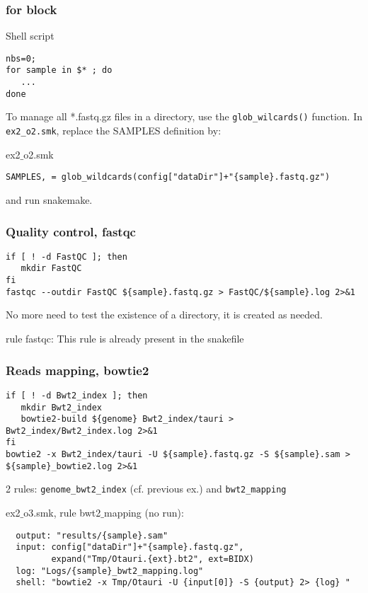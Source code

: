 \begin{frame}[containsverbatim]
\frametitle{for block}
\begin{exampleblock}{Shell script}
\begin{lstlisting}
nbs=0;
for sample in $* ; do 
   ...
done
\end{lstlisting}
\end{exampleblock}
To manage all *.fastq.gz files in a directory, use the \verb|glob_wilcards()| function. In \verb|ex2_o2.smk|, replace the SAMPLES definition by:
\begin{exampleblock}{ex2$\_$o2.smk}
\begin{lstlisting}
SAMPLES, = glob_wildcards(config["dataDir"]+"{sample}.fastq.gz")
\end{lstlisting}
\end{exampleblock}
and run snakemake.
\end{frame}
\begin{frame}[containsverbatim]
\frametitle{Quality control, fastqc}
\begin{exampleblock}{}
\begin{lstlisting}
if [ ! -d FastQC ]; then
   mkdir FastQC
fi
fastqc --outdir FastQC ${sample}.fastq.gz > FastQC/${sample}.log 2>&1
\end{lstlisting}
\end{exampleblock}
No more need to test the existence of a directory, it is created as needed.
\begin{exampleblock}{rule fastqc:}
This rule is already present in the snakefile
\end{exampleblock}
\end{frame}
\begin{frame}[containsverbatim]
\frametitle{Reads mapping, bowtie2}
\begin{exampleblock}{}
\begin{lstlisting}
if [ ! -d Bwt2_index ]; then
   mkdir Bwt2_index
   bowtie2-build ${genome} Bwt2_index/tauri > Bwt2_index/Bwt2_index.log 2>&1
fi
bowtie2 -x Bwt2_index/tauri -U ${sample}.fastq.gz -S ${sample}.sam > ${sample}_bowtie2.log 2>&1
\end{lstlisting}
\end{exampleblock}
2 rules: \verb|genome_bwt2_index| (cf. previous ex.) and \verb|bwt2_mapping|
\begin{exampleblock}{ex2$\_$o3.smk, rule bwt2$\_$mapping (no run):}
\begin{lstlisting}
  output: "results/{sample}.sam"
  input: config["dataDir"]+"{sample}.fastq.gz",
         expand("Tmp/Otauri.{ext}.bt2", ext=BIDX)
  log: "Logs/{sample}_bwt2_mapping.log"
  shell: "bowtie2 -x Tmp/Otauri -U {input[0]} -S {output} 2> {log} "
\end{lstlisting}
\end{exampleblock}
\end{frame}
